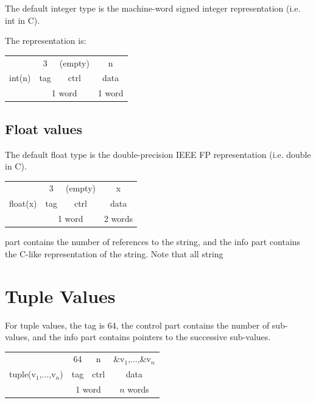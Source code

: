 \documentclass[a4paper,11pt]{article}
\newcommand{\code}[1]{\textsf{#1}}
\begin{document}
The default integer type is the machine-word signed integer representation (i.e. int in C).

The representation is:

\begin{tabular}{|c|c|c|c|}
\hline
\multirow{3}{*}{\code{int(n)}} & 3 & (empty) & \code{n} \\
\cline{2-4}
 & \code{tag} & \code{ctrl} & \code{data} \\
\cline{2-4}
 & \multicolumn{2}{|c|}{1 word} & 1 word \\
\hline
\end{tabular}

\subsection{Float values}

The default float type is the double-precision IEEE FP representation (i.e. double in C).

\begin{tabular}{|c|c|c|c|}
\hline
\multirow{3}{*}{\code{float(x)}} & 3 & (empty) & \code{x} \\
\cline{2-4}
 & \code{tag} & \code{ctrl} & \code{data} \\
\cline{2-4}
 & \multicolumn{2}{|c|}{1 word} & 2 words \\
\hline
\end{tabular}



 part contains the number of
references to the string, and the info part contains the C-like representation of
 the string.   Note that all string 

\section{Tuple Values}

For tuple values, the tag is 64,  the control part contains the number of
sub-values, and the info part contains pointers to the successive sub-values.

\begin{tabular}{|c|c|c|c|}
\hline
\multirow{3}{*}{\code{tuple(v$_1$,$\ldots$,v$_n$)}} & 64 & \code{n} & \code{\&v$_1$,$\ldots$,\&v$_n$} \\
\cline{2-4}
 & \code{tag} & \code{ctrl} & \code{data} \\
\cline{2-4}
 & \multicolumn{2}{|c|}{1 word} & $n$ words \\
\hline
\end{tabular}
\end{document}
